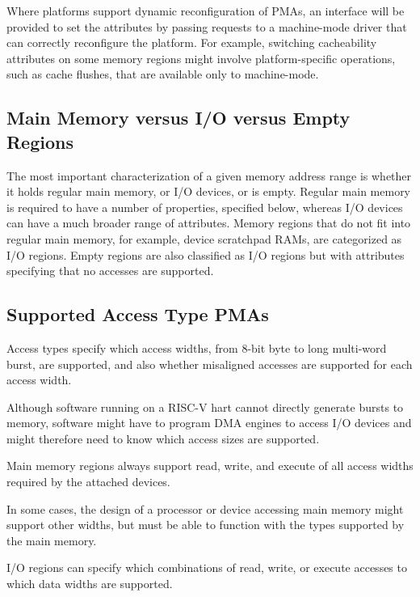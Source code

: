 Where platforms support dynamic reconfiguration of PMAs, an interface
will be provided to set the attributes by passing requests to a
machine-mode driver that can correctly reconfigure the platform.  For
example, switching cacheability attributes on some memory regions
might involve platform-specific operations, such as cache flushes,
that are available only to machine-mode.

\subsection{Main Memory versus I/O versus Empty Regions}

The most important characterization of a given memory address range is
whether it holds regular main memory, or I/O devices, or is empty.
Regular main memory is required to have a number of properties,
specified below, whereas I/O devices can have a much broader range of
attributes.  Memory regions that do not fit into regular main
memory, for example, device scratchpad RAMs, are categorized as I/O
regions.  Empty regions are also classified as I/O regions but with
attributes specifying that no accesses are supported.

\subsection{Supported Access Type PMAs}

Access types specify which access widths, from 8-bit byte to long
multi-word burst, are supported, and also whether misaligned accesses
are supported for each access width.

\begin{commentary}
Although software running on a RISC-V hart cannot directly generate
bursts to memory, software might have to program DMA engines to access
I/O devices and might therefore need to know which access sizes are
supported.
\end{commentary}

Main memory regions always support read, write, and execute of all
access widths required by the attached devices.

\begin{commentary}
In some cases, the design of a processor or device accessing main
memory might support other widths, but must be able to function with
the types supported by the main memory.
\end{commentary}

I/O regions can specify which combinations of read, write, or execute
accesses to which data widths are supported.

